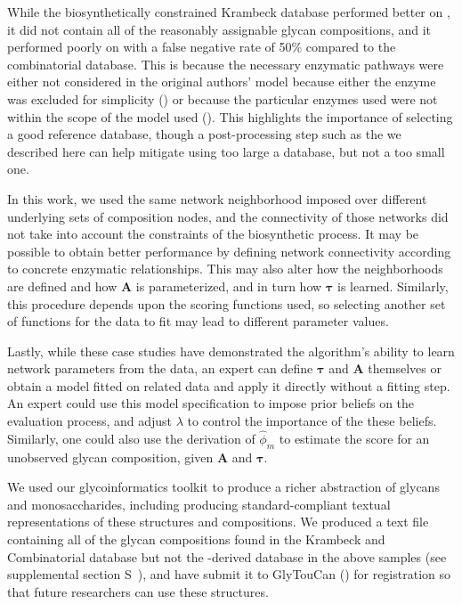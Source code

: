     While the biosynthetically constrained Krambeck database performed better on \rpserum,
    it did not contain all of the reasonably assignable glycan compositions, and it performed
    poorly on \philbs with a false negative rate of 50\% compared to the combinatorial database.
    This is because the necessary enzymatic pathways were either not considered in the original
    authors' model because either the enzyme was excluded for simplicity (\citealp{Krambeck2009}) or
    because the particular enzymes used were not within the scope of the model used
    (\citealp{Spiro2000,Ichimiya2014}). This highlights the importance of selecting a good reference
    database, though a post-processing step such as the we described here can help mitigate using
    too large a database, but not a too small one.

    In this work, we used the same network neighborhood imposed over different underlying sets of
    composition nodes, and the connectivity of those networks did not take into account the constraints
    of the biosynthetic process. It may be possible to obtain better performance by defining network
    connectivity according to concrete enzymatic relationships. This may also alter how the neighborhoods
    are defined and how $\mathbf{A}$ is parameterized, and in turn how $\mathbf{\tau}$ is learned.
    Similarly, this procedure depends upon the scoring functions used, so selecting another set of
    functions for the data to fit may lead to different parameter values.

    Lastly, while these case studies have demonstrated the algorithm's ability to learn network parameters
    from the data, an expert can define $\mathbf{\tau}$ and $\mathbf{A}$ themselves or obtain a model fitted
    on related data and apply it directly without a fitting step. An expert could use this model specification
    to impose prior beliefs on the evaluation process, and adjust $\lambda$ to control the importance of
    the these beliefs. Similarly, one could also use the derivation of ${\hat \phi_m}$ to estimate the score
    for an unobserved glycan composition, given $\mathbf{A}$ and $\mathbf{\tau}$.

    We used our glycoinformatics toolkit to produce a richer abstraction of glycans and monosaccharides,
    including producing standard-compliant textual representations of these structures and compositions.
    We produced a text file containing all of the glycan compositions found in the Krambeck and Combinatorial
    database but not the \glyspace-derived database in the above samples (see supplemental section
    S~),
    and have submit it to GlyTouCan (\citealp{Tiemeyer2017}) for registration so that future researchers can
    use these structures.

